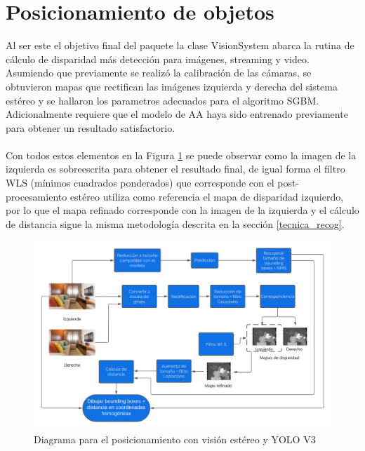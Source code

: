 \section{Posicionamiento de objetos}
Al ser este el objetivo final del paquete la clase VisionSystem abarca la rutina de cálculo de disparidad más detección para imágenes, streaming y video. Asumiendo que previamente se realizó la calibración de las cámaras, se obtuvieron mapas que rectifican las imágenes izquierda y derecha del sistema estéreo y se hallaron los parametros adecuados para el algoritmo SGBM. Adicionalmente requiere que el modelo de AA haya sido entrenado previamente para obtener un resultado satisfactorio.
\\
\\
Con todos estos elementos en la Figura \ref{vision_system_cycle} se puede observar como la imagen de la izquierda es sobreescrita para obtener el resultado final, de igual forma el filtro WLS (mínimos cuadrados ponderados) que corresponde con el post-procesamiento estéreo utiliza como referencia el mapa de disparidad izquierdo, por lo que el mapa refinado corresponde con la imagen de la izquierda y el cálculo de distancia sigue la misma metodología descrita en la sección \ref{tecnica_recog}.
\begin{figure}[H]
    \centering
    \includegraphics[scale=0.6]{Recursos/vision_system_cycle.png}
    \caption{Diagrama para el posicionamiento con visión estéreo y YOLO V3}
    \label{vision_system_cycle}
\end{figure}